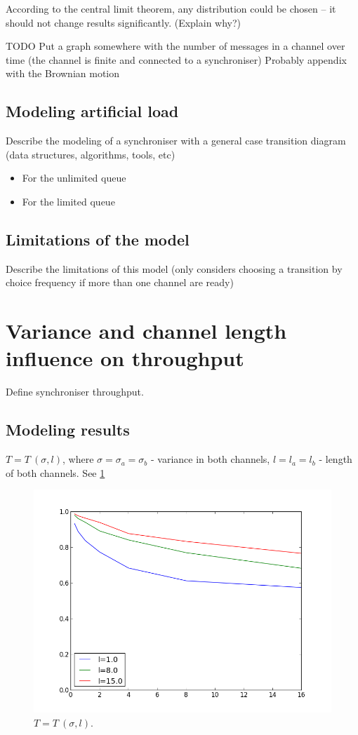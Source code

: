 According to the central limit theorem, any distribution could be chosen -- it should not change results significantly. (Explain why?)

TODO Put a graph somewhere with the number of messages in a channel over time (the channel is finite and connected to a synchroniser) Probably appendix with the Brownian motion

  \subsection{Modeling artificial load}
Describe the modeling of a synchroniser with a general case transition diagram (data structures, algorithms, tools, etc)
    \begin{itemize}
    \item For the unlimited queue
    \item For the limited queue
    \end{itemize}

  \subsection{Limitations of the model}
Describe the limitations of this model (only considers choosing a transition by choice frequency if more than one channel are ready)


\section{Variance and channel length influence on throughput}
Define synchroniser throughput.
  \subsection{Modeling results}
$T = T \: (\sigma, l)$, where $\sigma = \sigma_{a} = \sigma_{b}$ - variance in both channels, $l = l_{a} = l_{b}$ - length of both channels. See \ref{fig:t_s}
    \begin{figure}[here]
    \centering
    \includegraphics[scale=0.4]{figs/thr_(disp,l).png}
    \caption{$T = T \: (\sigma, l)$.}
    \label{fig:t_s}
    \end{figure}

